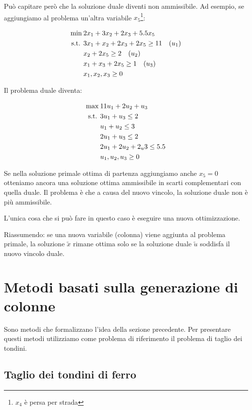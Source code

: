 Può capitare però che la soluzione duale diventi non ammissibile. Ad esempio, se aggiungiamo al problema un'altra variabile $x_5$\footnote{$x_4$ è persa per strada}:

\begin{align*}
\min\:& 2x_1 + 3x_2 +2x_3 + 5.5x_5\\
\text{s.t. }  & 3x_1 + x_2 +2x_3 +2x_5\geq 11 \quad (u_1)\\
& x_2 +2x_5\geq 2 \quad (u_2) \\
& x_1 +x_3 +2x_5\geq 1 \quad (u_3) \\
& x_1, x_2, x_3 \geq 0
\end{align*}

Il problema duale diventa:

\begin{align*}
\max\:& 11u_1 + 2u_2 + u_3 \\
\text{s.t. }  & 3u_1 + u_3 \leq 2 \\
& u_1 + u_2 \leq 3\\
& 2u_1 + u_3 \leq 2\\
& 2u_1 + 2u_2 +2_u3 \leq 5.5 \\
& u_1, u_2, u_3 \geq 0
\end{align*}

Se nella soluzione primale ottima di partenza aggiungiamo anche $x_5 =0$ otteniamo ancora una soluzione ottima ammissibile in scarti complementari con quella duale.
Il problema è che a causa del nuovo vincolo, la soluzione duale non è più ammissibile.

L'unica cosa che si può fare in questo caso è eseguire una nuova ottimizzazione.

Riassumendo: se una nuova variabile (colonna) viene aggiunta al problema primale, la soluzione $\tilde{x}$ rimane ottima solo se la soluzione duale $\tilde{u}$ soddisfa il nuovo vincolo duale.

\section{Metodi basati sulla generazione di colonne}

Sono metodi che formalizzano l'idea della sezione precedente.
Per presentare questi metodi utilizziamo come problema di riferimento il problema di taglio dei tondini.

\subsection{Taglio dei tondini di ferro}

